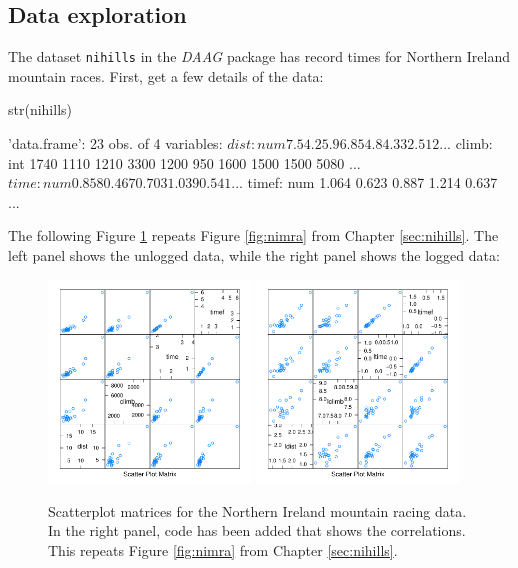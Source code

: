 \documentclass{tufte-book}\usepackage[]{graphicx}\usepackage[]{color}
\newcommand{\txtt}[1]{\texttt{#1}}
\begin{document}
\subsection*{Data exploration}

The dataset \txtt{nihills} in the {\em DAAG} package has
record times for Northern Ireland mountain races.  First, get a few
details of the data:
\begin{fullwidth}
\begin{Schunk}
\begin{Sinput}
str(nihills)
\end{Sinput}
\begin{Soutput}
'data.frame':	23 obs. of  4 variables:
 $ dist : num  7.5 4.2 5.9 6.8 5 4.8 4.3 3 2.5 12 ...
 $ climb: int  1740 1110 1210 3300 1200 950 1600 1500 1500 5080 ...
 $ time : num  0.858 0.467 0.703 1.039 0.541 ...
 $ timef: num  1.064 0.623 0.887 1.214 0.637 ...
\end{Soutput}
\end{Schunk}
\end{fullwidth}

The following Figure \ref{fig:nimra-reg} repeats Figure
\ref{fig:nimra} from Chapter \ref{sec:nihills}.
The left panel shows the unlogged data, while the
right panel shows the logged data:
\begin{figure}
\vspace*{-6pt}
\begin{Schunk}


\centerline{\includegraphics[width=0.48\textwidth]{figs/11-splot2-ni-1} \includegraphics[width=0.48\textwidth]{figs/11-splot2-ni-2} }

\end{Schunk}
\caption{Scatterplot matrices for the Northern Ireland mountain racing
  data. In the right panel, code has been added that shows the
  correlations.
This repeats Figure \ref{fig:nimra} from Chapter \ref{sec:nihills}.
\label{fig:nimra-reg}}
\end{figure}
\end{document}
